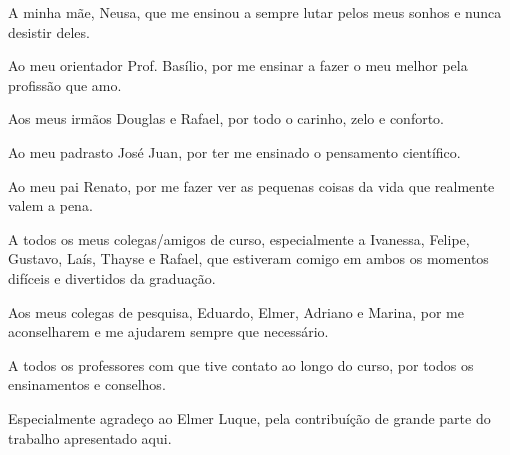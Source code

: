\documentclass[
	12pt,				%
	openany,			%
	oneside,			%
	a4paper,			%
	english,			%
	brazil				%
	]{abntex2}
\begin{document}
\begin{agradecimentos}
A minha mãe, Neusa, que me ensinou a sempre lutar pelos meus sonhos e nunca desistir deles. \par 

Ao meu orientador Prof. Basílio, por me ensinar a fazer o meu melhor pela profissão que amo. \par

Aos meus irmãos Douglas e Rafael, por todo o carinho, zelo e conforto. \par

Ao meu padrasto José Juan, por ter me ensinado o pensamento científico. \par

Ao meu pai Renato, por me fazer ver as pequenas coisas da vida que realmente valem a pena. \par

A todos os meus colegas/amigos de curso, especialmente a Ivanessa, Felipe, Gustavo, Laís, Thayse e Rafael, que estiveram comigo em ambos os momentos difíceis e divertidos da graduação.  \par

Aos meus colegas de pesquisa, Eduardo, Elmer, Adriano e Marina, por me aconselharem e me ajudarem sempre que necessário. \par

A todos os professores com que tive contato ao longo do curso, por todos os ensinamentos e conselhos. \par

Especialmente agradeço ao Elmer Luque, pela contribuíção de grande parte do trabalho apresentado aqui. 


\end{agradecimentos}

\end{document}
